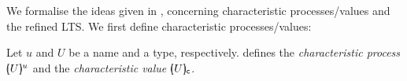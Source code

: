 \noi 
We formalise the ideas given in , concerning 
characteristic processes/values and the refined LTS.
We first define characteristic processes/values:

\begin{definition}
	\label{def:char}
	Let $u$ and $U$ be a name and a type, respectively.
	 defines the {\em characteristic process} 
	$[\!\!(U)\!\!]^{u}$ and the {\em characteristic value} $[\!\!(U)\!\!]_{\mathsf{c}}$.
\end{definition}

\begin{figure}
%		 
%		 
%		 
%		 

%		 
%		 
%		  
%		 
%					 
%		 
%		 
% 
%		 


\end{figure}
